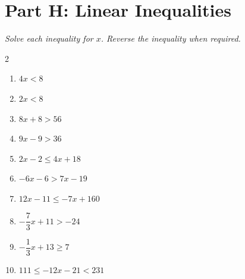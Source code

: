 \documentclass[11pt]{article}
\begin{document}
\section*{Part H: Linear Inequalities}
\noindent\textit{Solve each inequality for $x$. Reverse the inequality when required.}
\begin{multicols}{2}
\begin{enumerate}
  \item $4x < 8$
  \vspace{1.7cm}
  \item $2x < 8$
  \vspace{1.7cm}
  \item $8x + 8 > 56$
  \vspace{1.7cm}
  \item $9x - 9 > 36$
  \vspace{1.7cm}
  \item $2x - 2 \le 4x + 18$
  \vspace{1.7cm}
  \item $-6x - 6 > 7x - 19$
  \vspace{1.7cm}
  \item $12x - 11 \le -7x + 160$
  \vspace{1.7cm}
  \item $-\dfrac{7}{3}x + 11 > -24$
  \vspace{1.7cm}
  \item $-\dfrac{1}{3}x + 13 \ge 7$
  \vspace{1.7cm}
  \item $111 \le -12x - 21 < 231$
  \vspace{1.7cm}
\end{enumerate}
\end{multicols}
\end{document}
